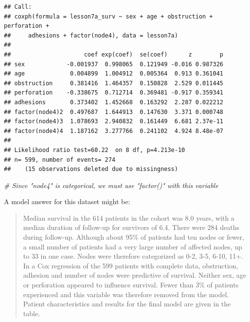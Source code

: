 \documentclass[]{book}
\newenvironment{Shaded}{\begin{snugshade}}{\end{snugshade}}
\newcommand{\CommentTok}[1]{\textcolor[rgb]{0.56,0.35,0.01}{\textit{#1}}}
\begin{document}
\begin{verbatim}
## Call:
## coxph(formula = lesson7a_surv ~ sex + age + obstruction + perforation + 
##     adhesions + factor(node4), data = lesson7a)
## 
##                     coef exp(coef)  se(coef)      z        p
## sex            -0.001937  0.998065  0.121949 -0.016 0.987326
## age             0.004899  1.004912  0.005364  0.913 0.361041
## obstruction     0.381416  1.464357  0.150828  2.529 0.011445
## perforation    -0.338675  0.712714  0.369481 -0.917 0.359341
## adhesions       0.373402  1.452668  0.163292  2.287 0.022212
## factor(node4)2  0.497687  1.644913  0.147630  3.371 0.000748
## factor(node4)3  1.078693  2.940832  0.161449  6.681 2.37e-11
## factor(node4)4  1.187162  3.277766  0.241102  4.924 8.48e-07
## 
## Likelihood ratio test=60.22  on 8 df, p=4.213e-10
## n= 599, number of events= 274 
##    (15 observations deleted due to missingness)
\end{verbatim}

\begin{Shaded}
\begin{Highlighting}[]
\CommentTok{# Since "node4" is categorical, we must use "factor()" with this variable}
\end{Highlighting}
\end{Shaded}

A model answer for this dataset might be:

\begin{quote}
Median survival in the 614 patients in the cohort was 8.0 years, with a
median duration of follow-up for survivors of 6.4. There were 284 deaths
during follow-up. Although about 95\% of patients had ten nodes or
fewer, a small number of patients had a very large number of affected
nodes, up to 33 in one case. Nodes were therefore categorized as 0-2,
3-5, 6-10, 11+. In a Cox regression of the 599 patients with complete
data, obstruction, adhesion and number of nodes were predictive of
survival. Neither sex, age or perforation appeared to influence
survival. Fewer than 3\% of patients experienced and this variable was
therefore removed from the model. Patient characteristics and results
for the final model are given in the table.
\end{quote}
\end{document}
